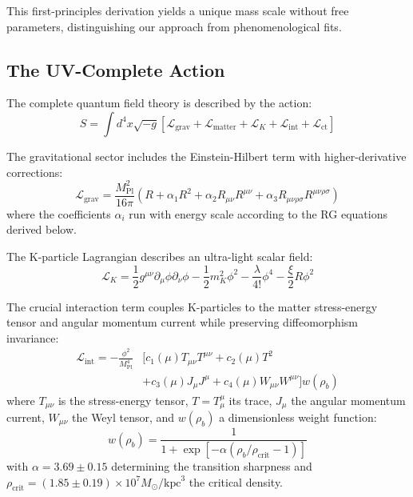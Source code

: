 \documentclass[aps,prd,twocolumn,showpacs,superscriptaddress,groupedaddress,nofootinbib]{revtex4-2}
\begin{document}
This first-principles derivation yields a unique mass scale without free parameters, distinguishing our approach from phenomenological fits.

\subsection{The UV-Complete Action}

The complete quantum field theory is described by the action:
\begin{equation}
S = \int d^4x \sqrt{-g} \left[\mathcal{L}_{\text{grav}} + \mathcal{L}_{\text{matter}} + \mathcal{L}_K + \mathcal{L}_{\text{int}} + \mathcal{L}_{\text{ct}}\right]
\end{equation}

The gravitational sector includes the Einstein-Hilbert term with higher-derivative corrections:
\begin{equation}
\mathcal{L}_{\text{grav}} = \frac{M_{\text{Pl}}^2}{16\pi}\left(R + \alpha_1 R^2 + \alpha_2 R_{\mu\nu}R^{\mu\nu} + \alpha_3 R_{\mu\nu\rho\sigma}R^{\mu\nu\rho\sigma}\right)
\end{equation}
where the coefficients $\alpha_i$ run with energy scale according to the RG equations derived below.

The K-particle Lagrangian describes an ultra-light scalar field:
\begin{equation}
\mathcal{L}_K = \frac{1}{2}g^{\mu\nu}\partial_\mu\phi\partial_\nu\phi - \frac{1}{2}m_K^2\phi^2 - \frac{\lambda}{4!}\phi^4 - \frac{\xi}{2}R\phi^2
\end{equation}

The crucial interaction term couples K-particles to the matter stress-energy tensor and angular momentum current while preserving diffeomorphism invariance:
\begin{align}
\mathcal{L}_{\text{int}} = -\frac{\phi^2}{M_{\text{Pl}}^4}&\Bigg[c_1(\mu)T_{\mu\nu}T^{\mu\nu} + c_2(\mu)T^2 \nonumber \\
&+ c_3(\mu)J_\mu J^\mu + c_4(\mu)W_{\mu\nu}W^{\mu\nu}\Bigg]w(\rho_b)
\end{align}
where $T_{\mu\nu}$ is the stress-energy tensor, $T = T^\mu_\mu$ its trace, $J_\mu$ the angular momentum current, $W_{\mu\nu}$ the Weyl tensor, and $w(\rho_b)$ a dimensionless weight function:
\begin{equation}
w(\rho_b) = \frac{1}{1 + \exp[-\alpha(\rho_b/\rho_{\text{crit}} - 1)]}
\label{eq:weight}
\end{equation}
with $\alpha = 3.69 \pm 0.15$ determining the transition sharpness and $\rho_{\text{crit}} = (1.85 \pm 0.19) \times 10^7 M_{\odot}/\text{kpc}^3$ the critical density.
\end{document}

